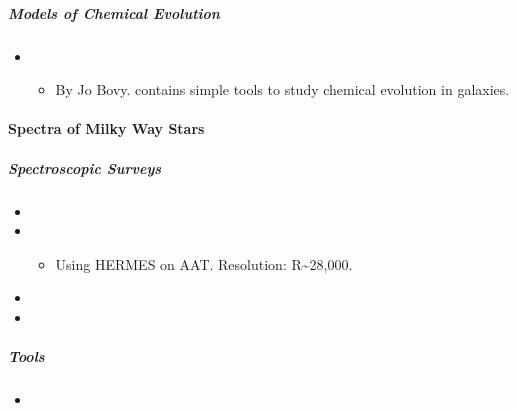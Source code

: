 \documentclass[letterpaper,10pt,english]{sphinxmanual}
\begin{document}
\subparagraph{Models of Chemical Evolution}
\label{\detokenize{resource/astro/topics/galactic_astronomy:models-of-chemical-evolution}}\begin{itemize}
\item {} 
\begin{itemize}
\item {} 
By Jo Bovy.  contains simple tools to study chemical
evolution in galaxies.

\end{itemize}

\end{itemize}


\paragraph{Spectra of Milky Way Stars}
\label{\detokenize{resource/astro/topics/galactic_astronomy:spectra-of-milky-way-stars}}

\subparagraph{Spectroscopic Surveys}
\label{\detokenize{resource/astro/topics/galactic_astronomy:spectroscopic-surveys}}\begin{itemize}
\item {} 

\item {} 
\begin{itemize}
\item {} 
Using HERMES on AAT. Resolution: R\textasciitilde{}28,000.

\end{itemize}

\item {} 

\item {} 

\end{itemize}


\subparagraph{Tools}
\label{\detokenize{resource/astro/topics/galactic_astronomy:tools}}\begin{itemize}
\item {} 

\end{itemize}
\end{document}
